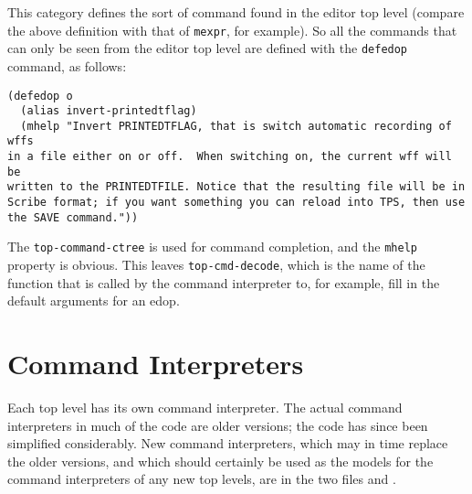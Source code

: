 This category defines the sort of command found in the editor top level (compare 
the above definition with that of {\tt mexpr}, for example). So all the commands 
that can only be seen from the editor top level are defined with the {\tt defedop} 
command, as follows:

\begin{verbatim}
(defedop o
  (alias invert-printedtflag)
  (mhelp "Invert PRINTEDTFLAG, that is switch automatic recording of wffs
in a file either on or off.  When switching on, the current wff will be
written to the PRINTEDTFILE. Notice that the resulting file will be in 
Scribe format; if you want something you can reload into TPS, then use
the SAVE command."))
\end{verbatim}

The {\tt top-command-ctree} is used for command completion, and the {\tt mhelp} 
property is obvious. This leaves {\tt top-cmd-decode}, which is the name of the
function that is called by the command interpreter to, for example, fill in the 
default arguments for an edop.

\section{Command Interpreters}

Each top level has its own command interpreter. The actual command interpreters
in much of the code are older versions; the code has since been simplified
considerably. New command interpreters, which may in time replace the older versions,
and which should certainly be used as the models for the command interpreters
of any new top levels, are in the two files  
and .
